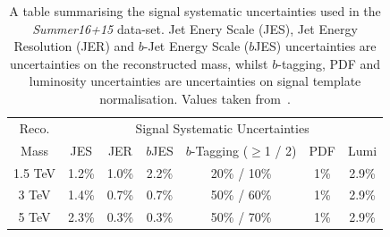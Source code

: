 \begin{table}[!htb]
  \centering
  \begin{tabular}{|c||c|c|c|c|c|c|}
    \hline
    Reco.   & \multicolumn{6}{c|}{Signal Systematic Uncertainties}                    \\ \cline{2-7} 
    Mass    & JES   & JER   & $b$JES  & $b$-Tagging ($\geq$1 / 2) & PDF & Lumi        \\
    \hline                                                                        
    1.5 TeV & 1.2\% & 1.0\% & 2.2\%   &        20\% / 10\%        & 1\% & 2.9\%       \\
    3 TeV   & 1.4\% & 0.7\% & 0.7\%   &        50\% / 60\%        & 1\% & 2.9\%       \\
    5 TeV   & 2.3\% & 0.3\% & 0.3\%   &        50\% / 70\%        & 1\% & 2.9\%       \\
    \hline
  \end{tabular}
\caption[A table summarising the signal systematic uncertainties used in the \textit{Summer16+15} data-set.
    Jet Enery Scale (JES), Jet Energy Resolution (JER) and $b$-Jet Energy Scale ($b$JES) uncertainties
    are uncertainties on the reconstructed mass,
    whilst $b$-tagging, PDF and luminosity uncertainties are uncertainties on signal template normalisation.]
        {A table summarising the signal systematic uncertainties used in the \textit{Summer16+15} data-set.
          Jet Enery Scale (JES), Jet Energy Resolution (JER) and $b$-Jet Energy Scale ($b$JES) uncertainties
          are uncertainties on the reconstructed mass,
          whilst $b$-tagging, PDF and luminosity uncertainties are uncertainties on signal template normalisation.
          Values taken from~\cite{dibjet-ichep_int}.}
  \label{tab:lim-summer_syst}
  \end{table}


